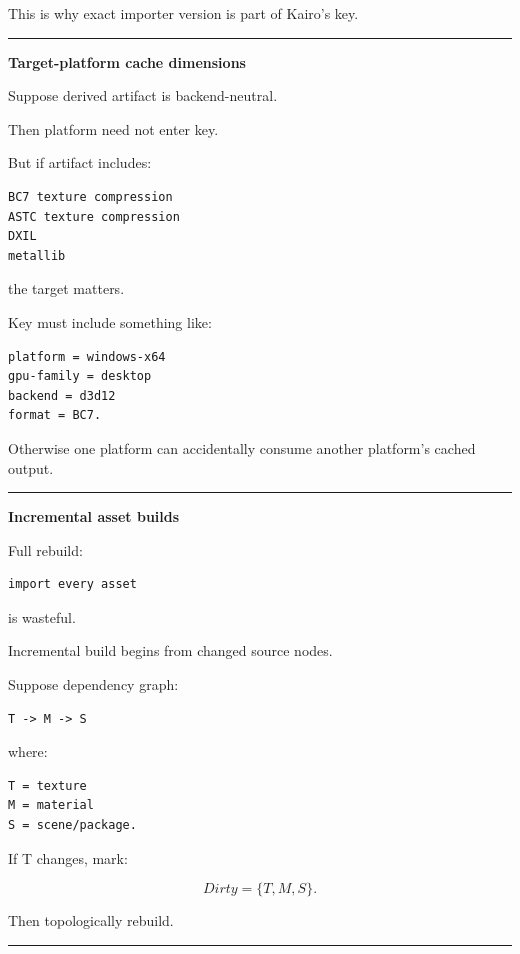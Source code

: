 This is why exact importer version is part of Kairo's key.

\begin{center}\rule{0.5\linewidth}{0.5pt}\end{center}

\textbf{Target-platform cache dimensions}

Suppose derived artifact is backend-neutral.

Then platform need not enter key.

But if artifact includes:

\begin{verbatim}
BC7 texture compression
ASTC texture compression
DXIL
metallib
\end{verbatim}

the target matters.

Key must include something like:

\begin{verbatim}
platform = windows-x64
gpu-family = desktop
backend = d3d12
format = BC7.
\end{verbatim}

Otherwise one platform can accidentally consume another platform's cached output.

\begin{center}\rule{0.5\linewidth}{0.5pt}\end{center}

\textbf{Incremental asset builds}

Full rebuild:

\begin{verbatim}
import every asset
\end{verbatim}

is wasteful.

Incremental build begins from changed source nodes.

Suppose dependency graph:

\begin{verbatim}
T -> M -> S
\end{verbatim}

where:

\begin{verbatim}
T = texture
M = material
S = scene/package.
\end{verbatim}

If T changes, mark:

\[
Dirty=\{T,M,S\}.
\]

Then topologically rebuild.

\begin{center}\rule{0.5\linewidth}{0.5pt}\end{center}

